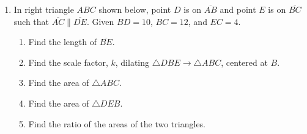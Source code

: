 \documentclass[12pt, oneside]{article}
\begin{document}
\begin{enumerate}[itemsep=1.7cm]
\item In right triangle $ABC$ shown below, point $D$ is on $\overline{AB}$ and point $E$ is on $\overline{BC}$ such that $\overline{AC} \parallel \overline{DE}$. Given $BD=10$, $BC=12$, and $EC=4$.
  \begin{center}
  \end{center}
  \begin{enumerate}
    \item Find the length of $\overline{BE}$. \vspace{0.5cm}
    \item Find the scale factor, $k$, dilating $\triangle DBE \rightarrow \triangle ABC$, centered at $B$. \vspace{1.5cm}
    \item Find the area of $\triangle ABC$. \vspace{2.5cm}
    \item Find the area of $\triangle DEB$. \vspace{2.5cm}
    \item Find the ratio of the areas of the two triangles. \vspace{2.5cm}
  \end{enumerate}

\end{enumerate}
\end{document}
